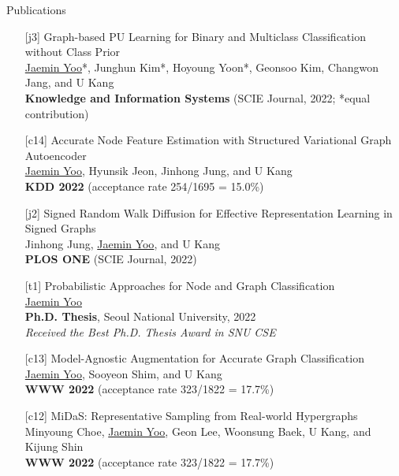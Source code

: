 \documentclass{resume} %
\begin{document}
\begin{rSection}{Publications}
\smallskip
\begin{enumerate}

	\item[{[j3]}]
		Graph-based PU Learning for Binary and Multiclass Classification without Class Prior \\
		\underline{Jaemin Yoo}*, Junghun Kim*, Hoyoung Yoon*, Geonsoo Kim, Changwon Jang, and U Kang \\
		\textbf{Knowledge and Information Systems} (SCIE Journal, 2022; *equal contribution) \\

	\item[{[c14]}]
		Accurate Node Feature Estimation with Structured Variational Graph Autoencoder \\
		\underline{Jaemin Yoo}, Hyunsik Jeon, Jinhong Jung, and U Kang \\
		\textbf{KDD 2022} (acceptance rate 254/1695 = 15.0\%) \\

	\item[{[j2]}]
		Signed Random Walk Diffusion for Effective Representation Learning in Signed Graphs \\
		Jinhong Jung, \underline{Jaemin Yoo}, and U Kang \\
		\textbf{PLOS ONE} (SCIE Journal, 2022)

	\item[{[t1]}]
		Probabilistic Approaches for Node and Graph Classification \\
		\underline{Jaemin Yoo} \\
		\textbf{Ph.D. Thesis}, Seoul National University, 2022 \\
		\emph{Received the Best Ph.D. Thesis Award in SNU CSE}

	\item[{[c13]}]
		Model-Agnostic Augmentation for Accurate Graph Classification \\
		\underline{Jaemin Yoo}, Sooyeon Shim, and U Kang \\
		\textbf{WWW 2022} (acceptance rate 323/1822 = 17.7\%) \\

	\item[{[c12]}]
		MiDaS: Representative Sampling from Real-world Hypergraphs \\
		Minyoung Choe, \underline{Jaemin Yoo}, Geon Lee, Woonsung Baek, U Kang, and Kijung Shin \\
		\textbf{WWW 2022} (acceptance rate 323/1822 = 17.7\%) \\


\end{enumerate}
\end{rSection}
\end{document}
